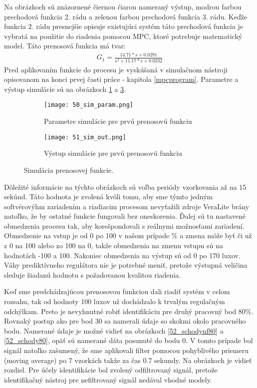 Na obrázkoch sú znázornené čiernou čiarou nameraný výstup, modrou farbou prechodová funkcia 2. rádu a zelenou farbou prechodová funkcia 3. rádu. Keďže funkcia 2. rádu presnejšie opisuje existujúci systém táto prechodová funkcia je vybratá na použitie do riadenia pomocou MPC, ktoré potrebuje matematický model. Táto prenosová funkcia má tvar:
\begin{equation} \label{eq40}
\begin{split}
 G_1 = \frac{14.71*s + 0.0291}{s^2 + 11.17*s + 0.0232}
\end{split}
\end{equation} 
Pred aplikovaním funkcie do procesu je  vyskúšaná v simulačnom nástroji opisovanom na konci prvej časti práce - kapitola \ref{mpcprogram}. Parametre a výstup simulácie sú na obrázkoch \ref{50_sim_param} a \ref{51_sim_out}.
\begin{figure}[!htbp]
\centering
\begin{subfigure}{0.5\linewidth}
\texttt{[image: 50\_sim\_param.png]}
\caption{Parametre simulácie pre prvú prenosovú funkciu}
\label{50_sim_param}
\end{subfigure}%
\begin{subfigure}{0.5\linewidth}
\texttt{[image: 51\_sim\_out.png]}
\caption{Výstup simulácie pre prvú prenosovú funkciu}
\label{51_sim_out}
\end{subfigure}
\caption{Simulácia prenosovej funkcie.}
\end{figure}
Dôležité informácie na týchto obrázkoch sú voľba periódy vzorkovania až na 15 sekúnd. Táto hodnota je zvolená kvôli tomu, aby sme týmto jedným softvérovýhm zariadením a riadiacim procesom nevyťažili  zdroje VeraLite brány natoľko, že by ostatné funkcie fungovali bez oneskorenia.  Ďalej sú tu nastavené obmedzenia procesu tak, aby korešpondovali s reálnymi možnosťami zariadení. Obmedzenie na vstup je od 0 po 100 v našom prípade \% a zmena môže byť či už z 0 na 100 alebo zo 100 na 0, takže obmedzenia na zmenu vstupu sú na hodnotách -100 a 100. Nakoniec obmedzenia na výstup sú od 0 po 170 luxov. Váhy prediktívneho regulátora nie je potrebné meniť, pretože výstupná veličina sleduje žiadanú hodnotu s požadovanou kvalitou riadenia.
 
\indent Keď sme predchádzajúcou prenosovou funkciou dali riadiť systém v celom rozsahu, tak od hodnoty 100 luxov už dochádzalo k trvalým regulačným odchýlkam. Preto je nevyhnutné robiť identifikáciu pre druhý pracovný bod 80\%. Rovnaký postup ako pre bod 30 sa namerali údaje so skokmi okolo pracovného bodu. Namerané údaje je možné vidieť na obrázkoch \ref{52_schodynf80} a \ref{52_schody80}, opäť sú namerané dáta posunuté do bodu 0. V tomto prípade bol signál natoľko zašumený, že sme aplikovali filter pomocou pohyblivého priemeru (moving average) po 7 vzorkách takže za čas 0.7 sekundy. Na obrázkoch je vidieť rozdiel. Pre účely identifikácie bol zvolený odfiltrovaný signál, pretože identifikačný nástroj pre nefiltrovaný signál nedával vhodné modely. 


